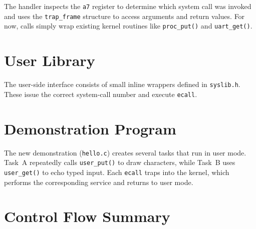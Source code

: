\begin{figure}[H]
\centering

\end{figure}

The handler inspects the \texttt{a7} register to determine which system call was
invoked and uses the \texttt{trap\_frame} structure to access arguments and
return values.  
For now, calls simply wrap existing kernel routines like \texttt{proc\_put()} and
\texttt{uart\_get()}.

\section{User Library}

The user-side interface consists of small inline wrappers defined in
\texttt{syslib.h}.  
These issue the correct system-call number and execute \texttt{ecall}.

\begin{figure}[H]
\centering

\end{figure}

\section{Demonstration Program}

The new demonstration (\texttt{hello.c}) creates several tasks that run in user
mode.  
Task~A repeatedly calls \texttt{user\_put()} to draw characters, while
Task~B uses \texttt{user\_get()} to echo typed input.
Each \texttt{ecall} traps into the kernel, which performs the corresponding
service and returns to user mode.

\begin{figure}[H]
\centering

\end{figure}

\section{Control Flow Summary}

